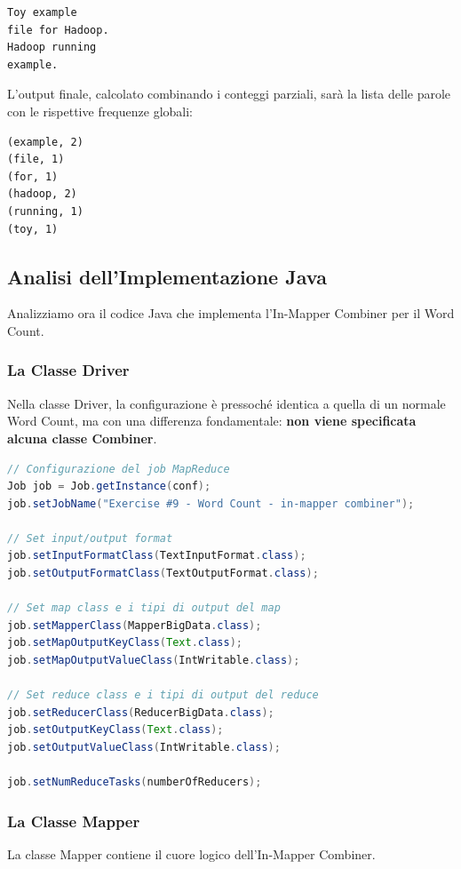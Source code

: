 \begin{verbatim}
Toy example
file for Hadoop.
Hadoop running
example.
\end{verbatim}

L'output finale, calcolato combinando i conteggi parziali, sarà la lista delle parole con le rispettive frequenze globali:
\begin{verbatim}
(example, 2)
(file, 1)
(for, 1)
(hadoop, 2)
(running, 1)
(toy, 1)
\end{verbatim}

\subsection{Analisi dell'Implementazione Java}

Analizziamo ora il codice Java che implementa l'In-Mapper Combiner per il Word Count.

\subsubsection{La Classe Driver}
Nella classe Driver, la configurazione è pressoché identica a quella di un normale Word Count, ma con una differenza fondamentale: \textbf{non viene specificata alcuna classe Combiner}.

\begin{lstlisting}[language=Java]
// Configurazione del job MapReduce
Job job = Job.getInstance(conf); 
job.setJobName("Exercise #9 - Word Count - in-mapper combiner");

// Set input/output format
job.setInputFormatClass(TextInputFormat.class);
job.setOutputFormatClass(TextOutputFormat.class);

// Set map class e i tipi di output del map
job.setMapperClass(MapperBigData.class);
job.setMapOutputKeyClass(Text.class);
job.setMapOutputValueClass(IntWritable.class);

// Set reduce class e i tipi di output del reduce
job.setReducerClass(ReducerBigData.class);
job.setOutputKeyClass(Text.class);
job.setOutputValueClass(IntWritable.class);

job.setNumReduceTasks(numberOfReducers);
\end{lstlisting}

\subsubsection{La Classe Mapper}
La classe Mapper contiene il cuore logico dell'In-Mapper Combiner.

